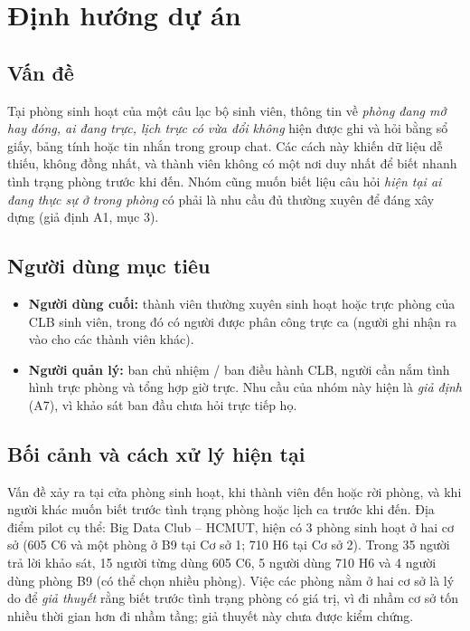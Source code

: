 \section{Định hướng dự án}

\subsection{Vấn đề}
Tại phòng sinh hoạt của một câu lạc bộ sinh viên, thông tin về \emph{phòng đang mở hay đóng, ai đang trực, lịch trực có vừa đổi không} hiện được ghi và hỏi bằng sổ giấy, bảng tính hoặc tin nhắn trong group chat. Các cách này khiến dữ liệu dễ thiếu, không đồng nhất, và thành viên không có một nơi duy nhất để biết nhanh tình trạng phòng trước khi đến. Nhóm cũng muốn biết liệu câu hỏi \emph{hiện tại ai đang thực sự ở trong phòng} có phải là nhu cầu đủ thường xuyên để đáng xây dựng (giả định A1, mục 3).

\subsection{Người dùng mục tiêu}
\begin{itemize}[nosep]
\item \textbf{Người dùng cuối:} thành viên thường xuyên sinh hoạt hoặc trực phòng của CLB sinh viên, trong đó có người được phân công trực ca (người ghi nhận ra vào cho các thành viên khác).
\item \textbf{Người quản lý:} ban chủ nhiệm / ban điều hành CLB, người cần nắm tình hình trực phòng và tổng hợp giờ trực. Nhu cầu của nhóm này hiện là \emph{giả định} (A7), vì khảo sát ban đầu chưa hỏi trực tiếp họ.
\end{itemize}

\subsection{Bối cảnh và cách xử lý hiện tại}
Vấn đề xảy ra tại cửa phòng sinh hoạt, khi thành viên đến hoặc rời phòng, và khi người khác muốn biết trước tình trạng phòng hoặc lịch ca trước khi đến. Địa điểm pilot cụ thể: Big Data Club -- HCMUT, hiện có 3 phòng sinh hoạt ở hai cơ sở (605 C6 và một phòng ở B9 tại Cơ sở 1; 710 H6 tại Cơ sở 2). Trong 35 người trả lời khảo sát, 15 người từng dùng 605 C6, 5 người dùng 710 H6 và 4 người dùng phòng B9 (có thể chọn nhiều phòng). Việc các phòng nằm ở hai cơ sở là lý do để \emph{giả thuyết} rằng biết trước tình trạng phòng có giá trị, vì đi nhầm cơ sở tốn nhiều thời gian hơn đi nhầm tầng; giả thuyết này chưa được kiểm chứng.

